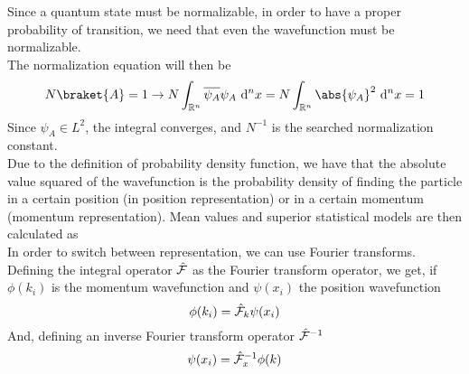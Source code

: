 \documentclass[../qm.tex]{subfiles}
\begin{document}
	Since a quantum state must be normalizable, in order to have a proper probability of transition, we need that even the wavefunction must be normalizable.\\
	The normalization equation will then be
	\begin{equation}
		N\braket{A}=1\rightarrow N\int_{\mathbb{R}^n}\overline{\psi_A}\psi_A\diff[n]{x}=N\int_{\mathbb{R}^n}\abs{\psi_A}^2\diff[n]{x}=1
		\label{eq:normalization}
	\end{equation}
	Since $\psi_A\in L^2$, the integral converges, and $N^{-1}$ is the searched normalization constant.\\
	Due to the definition of probability density function, we have that the absolute value squared of the wavefunction is the probability density of finding the particle in a certain position (in position representation) or in a certain momentum (momentum representation). Mean values and superior statistical models are then calculated as \\
	In order to switch between representation, we can use Fourier transforms. Defining the integral operator $\hat{\mathcal{F}}$ as the Fourier transform operator, we get, if $\phi(k_i)$ is the momentum wavefunction and $\psi(x_i)$ the position wavefunction
	\begin{equation}
		\phi(k_i)=\hat{\mathcal{F}}_{k}\psi(x_i)
		\label{eq:fouriertransformmompos}
	\end{equation}
	And, defining an inverse Fourier transform operator $\hat{\mathcal{F}}^{-1}$
	\begin{equation}
		\psi(x_i)=\hat{\mathcal{F}}^{-1}_{x}\phi(k)
		\label{eq:fouriertrasformposmom}
	\end{equation}
\end{document}
